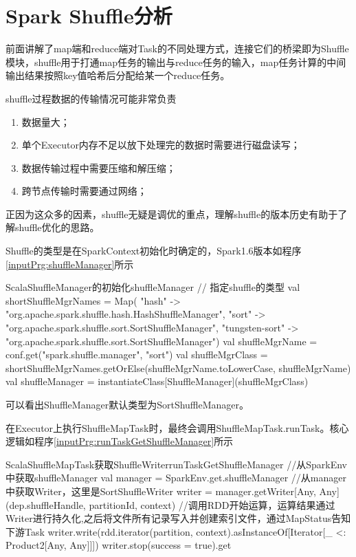 \chapter{Spark Shuffle分析}

前面讲解了map端和reduce端对Task的不同处理方式，连接它们的桥梁即为Shuffle模块，shuffle用于打通map任务的输出与reduce任务的输入，map任务计算的中间输出结果按照key值哈希后分配给某一个reduce任务。

shuffle过程数据的传输情况可能非常负责
\begin{enumerate}[\bfseries 1]
	\item 数据量大；
	\item 单个Executor内存不足以放下处理完的数据时需要进行磁盘读写；
	\item 数据传输过程中需要压缩和解压缩；
	\item 跨节点传输时需要通过网络；
\end{enumerate}

正因为这众多的因素，shuffle无疑是调优的重点，理解shuffle的版本历史有助于了解shuffle优化的思路。

Shuffle的类型是在SparkContext初始化时确定的，Spark1.6版本如程序\ref{inputPrg:shuffleManager}所示
\begin{codeInput}{Scala}{ShuffleManager的初始化}{shuffleManager}
 //   指定shuffle的类型
 val shortShuffleMgrNames = Map(
 "hash" -> "org.apache.spark.shuffle.hash.HashShuffleManager",
 "sort" -> "org.apache.spark.shuffle.sort.SortShuffleManager",
 "tungsten-sort" -> "org.apache.spark.shuffle.sort.SortShuffleManager")
 val shuffleMgrName = conf.get("spark.shuffle.manager", "sort")
 val shuffleMgrClass = shortShuffleMgrNames.getOrElse(shuffleMgrName.toLowerCase, shuffleMgrName)
 val shuffleManager = instantiateClass[ShuffleManager](shuffleMgrClass)
\end{codeInput}

可以看出ShuffleManager默认类型为SortShuffleManager。

在Executor上执行ShuffleMapTask时，最终会调用ShuffleMapTask.runTask。核心逻辑如程序\ref{inputPrg:runTaskGetShuffleManager}所示
\begin{codeInput}{Scala}{ShuffleMapTask获取ShuffleWriter}{runTaskGetShuffleManager}
 //从SparkEnv中获取shuffleManager
 val manager = SparkEnv.get.shuffleManager
 //从manager中获取Writer，这里是SortShuffleWriter
 writer = manager.getWriter[Any, Any](dep.shuffleHandle, partitionId, context)
 //调用RDD开始运算，运算结果通过Writer进行持久化,之后将文件所有记录写入并创建索引文件，通过MapStatus告知下游Task
 writer.write(rdd.iterator(partition, context).asInstanceOf[Iterator[_ <: Product2[Any, Any]]])
 writer.stop(success = true).get
\end{codeInput}
